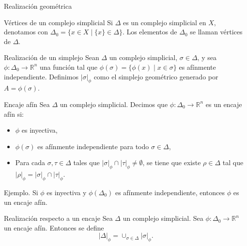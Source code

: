 \documentclass[spanish, presentation]{beamer}
\begin{document}
\begin{frame}[label={sec:org9ca7045}]{Realización geométrica}
\begin{block}{Vértices de un complejo simplicial}
Si \(\Delta\) es un complejo simplicial en \(X\), denotamos con \(\Delta_{0}=\{x\in X\mid \{x\}\in \Delta\}\). Los elementos de \(\Delta_{0}\) se llaman \alert{vértices} de \(\Delta\).
\end{block}

\begin{block}{Realización de un simplejo}
Sean \(\Delta\) un complejo simplicial, \(\sigma\in\Delta\), y sea \(\phi\colon\Delta_{0}\to \mathbb{R}^{n}\) una función tal que \(\phi(\sigma)=\{\phi(x)\mid x\in\sigma\}\) es afínmente independiente. Definimos \(|\sigma|_{\phi}\) como el simplejo geométrico generado por \(A=\phi(\sigma)\).
\end{block}

\begin{block}{Encaje afín}
Sea \(\Delta\) un complejo simplicial. Decimos que  \(\phi\colon \Delta_{0}\to\mathbb{R}^{n}\) es un \alert{encaje afín} si:
\begin{itemize}
\item \(\phi\) es inyectiva,
\item \(\phi(\sigma)\) es afínmente independiente para todo \(\sigma\in\Delta\),
\item Para cada \(\sigma,\tau\in\Delta\) tales que \(|\sigma|_{\phi}\cap|\tau|_{\phi}\ne\emptyset\), se tiene que existe \(\rho\in\Delta\) tal que \(|\rho|_{\phi}=|\sigma|_{\phi}\cap|\tau|_{\phi}\).
\end{itemize}
\end{block}

\begin{block}{Ejemplo.}
Si \(\phi\) es inyectiva y \(\phi(\Delta_{0})\) es afínmente independiente, entonces \(\phi\) es un encaje afín.
\end{block}

\begin{block}{Realización respecto a un encaje}
Sea \(\Delta\) un complejo simplicial. Sea \(\phi\colon \Delta_{0}\to \mathbb{R}^{n}\) un encaje afín. Entonces se define
\begin{equation}
\label{eq:1}
|\Delta|_{\phi}=\cup_{\sigma\in\Delta}|\sigma|_{\phi}.
\end{equation}
\end{block}
\end{frame}
\end{document}
